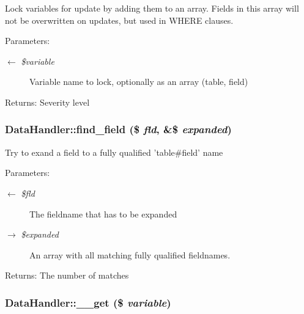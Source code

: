 Lock variables for update by adding them to an array. Fields in this array will not be overwritten on updates, but used in WHERE clauses. \begin{Desc}
\item[Parameters:]
\begin{description}
\item[\mbox{$\leftarrow$} {\em \$variable}]Variable name to lock, optionally as an array (table, field) \end{description}
\end{Desc}
\begin{Desc}
\item[Returns:]Severity level \end{Desc}
\hypertarget{classDataHandler_1e4789e22370c96ae479bc3a58f30984}{
\subsubsection{\setlength{\rightskip}{0pt plus 5cm}DataHandler::find\_\-field (\$ {\em fld}, \&\$ {\em expanded})}}
\label{classDataHandler_1e4789e22370c96ae479bc3a58f30984}


Try to exand a field to a fully qualified 'table\#field' name

\begin{Desc}
\item[Parameters:]
\begin{description}
\item[\mbox{$\leftarrow$} {\em \$fld}]The fieldname that has to be expanded \item[\mbox{$\rightarrow$} {\em \$expanded}]An array with all matching fully qualified fieldnames. \end{description}
\end{Desc}
\begin{Desc}
\item[Returns:]The number of matches \end{Desc}
\hypertarget{classDataHandler_f58cbd10b032e4904fa15ce950d521e2}{
\subsubsection{\setlength{\rightskip}{0pt plus 5cm}DataHandler::\_\-\_\-get (\$ {\em variable})}}
\label{classDataHandler_f58cbd10b032e4904fa15ce950d521e2}



